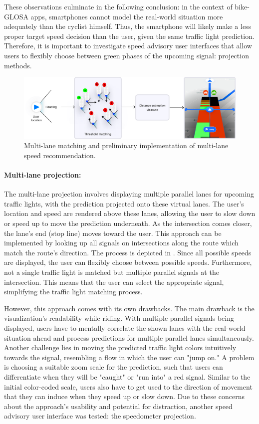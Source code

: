 These observations culminate in the following conclusion: in the context of bike-GLOSA apps, smartphones cannot model the real-world situation more adequately than the cyclist himself. Thus, the smartphone will likely make a less proper target speed decision than the user, given the same traffic light prediction. Therefore, it is important to investigate speed advisory user interfaces that allow users to flexibly choose between green phases of the upcoming signal: projection methods.

\begin{figure}[htbp]
\centering
\includegraphics[width=\linewidth]{images/multi-lane-view.png}
\caption{Multi-lane matching and preliminary implementation of multi-lane speed recommendation.}
\label{fig:multi-lane-view}
\end{figure}

\paragraph{Multi-lane projection:} The multi-lane projection involves displaying multiple parallel lanes for upcoming traffic lights, with the prediction projected onto these virtual lanes. The user's location and speed are rendered above these lanes, allowing the user to slow down or speed up to move the prediction underneath. As the intersection comes closer, the lane's end (stop line) moves toward the user. This approach can be implemented by looking up all signals on intersections along the route which match the route's direction. The process is depicted in . Since all possible speeds are displayed, the user can flexibly choose between possible speeds. Furthermore, not a single traffic light is matched but multiple parallel signals at the intersection. This means that the user can select the appropriate signal, simplifying the traffic light matching process.

However, this approach comes with its own drawbacks. The main drawback is the visualization's readability while riding. With multiple parallel signals being displayed, users have to mentally correlate the shown lanes with the real-world situation ahead and process predictions for multiple parallel lanes simultaneously. Another challenge lies in moving the predicted traffic light colors intuitively towards the signal, resembling a flow in which the user can "jump on." A problem is choosing a suitable zoom scale for the prediction, such that users can differentiate when they will be "caught" or "run into" a red signal. Similar to the initial color-coded scale, users also have to get used to the direction of movement that they can induce when they speed up or slow down. Due to these concerns about the approach's usability and potential for distraction, another speed advisory user interface was tested: the speedometer projection.

